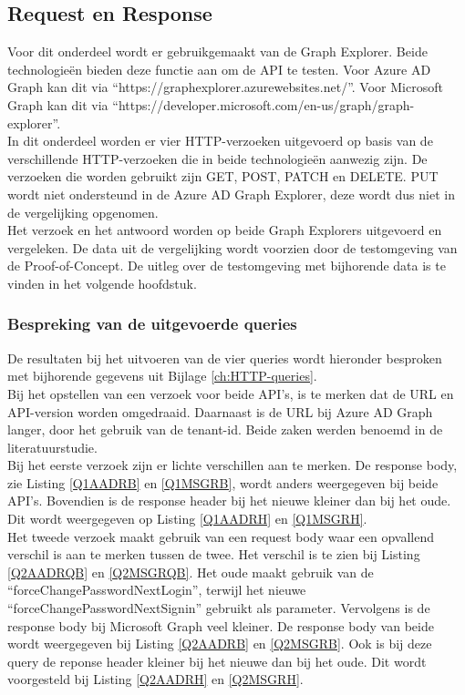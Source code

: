 \subsection{Request en Response} %

Voor dit onderdeel wordt er gebruikgemaakt van de Graph Explorer. Beide technologieën bieden deze functie aan om de \ac{API} te testen. Voor Azure \ac{AD} Graph kan dit via “https://graphexplorer.azurewebsites.net/”. Voor Microsoft Graph kan dit via “https://developer.microsoft.com/en-us/graph/graph-explorer”. \\

In dit onderdeel worden er vier HTTP-verzoeken uitgevoerd op basis van de verschillende \ac{HTTP}-verzoeken die in beide technologieën aanwezig zijn. De verzoeken die worden gebruikt zijn GET, POST, PATCH en DELETE. PUT wordt niet ondersteund in de Azure \ac{AD} Graph Explorer, deze wordt dus niet in de vergelijking opgenomen. \\

Het verzoek en het antwoord worden op beide Graph Explorers uitgevoerd en vergeleken. De data uit de vergelijking wordt voorzien door de testomgeving van de Proof-of-Concept. De uitleg over de testomgeving met bijhorende data is te vinden in het volgende hoofdstuk. 

\subsubsection{Bespreking van de uitgevoerde queries}

De resultaten bij het uitvoeren van de vier queries wordt hieronder besproken met bijhorende gegevens uit Bijlage \ref{ch:HTTP-queries}. \\

Bij het opstellen van een verzoek voor beide \Ac{API}'s, is te merken dat de \Ac{URL} en \Ac{API}-version worden omgedraaid. Daarnaast is de \Ac{URL} bij Azure \ac{AD} Graph langer, door het gebruik van de tenant-id. Beide zaken werden benoemd in de literatuurstudie. \\

Bij het eerste verzoek zijn er lichte verschillen aan te merken. De response body, zie Listing \ref{Q1AADRB} en \ref{Q1MSGRB}, wordt anders weergegeven bij beide \ac{API}'s. Bovendien is de response header bij het nieuwe kleiner dan bij het oude. Dit wordt weergegeven op Listing \ref{Q1AADRH} en \ref{Q1MSGRH}. \\

Het tweede verzoek maakt gebruik van een request body waar een opvallend verschil is aan te merken tussen de twee. Het verschil is te zien bij Listing \ref{Q2AADRQB} en \ref{Q2MSGRQB}. Het oude maakt gebruik van de “forceChangePasswordNextLogin”, terwijl het nieuwe “forceChangePasswordNextSignin” gebruikt als parameter. Vervolgens is de response body bij Microsoft Graph veel kleiner. De response body van beide wordt weergegeven bij Listing \ref{Q2AADRB} en \ref{Q2MSGRB}. Ook is bij deze query de reponse header kleiner bij het nieuwe dan bij het oude. Dit wordt voorgesteld bij Listing \ref{Q2AADRH} en \ref{Q2MSGRH}. \\

